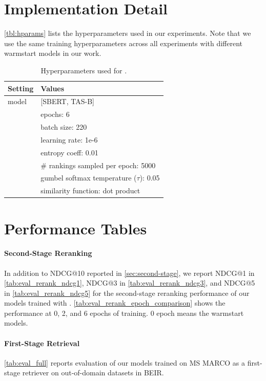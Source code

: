 \documentclass{article}
\begin{document}
\section{Implementation Detail}
\label{app:implementation}
\autoref{tbl:hparams} lists the hyperparameters used in our experiments. Note that we use the same training hyperparameters across all experiments with different warmstart models in our work.
\begin{table}[tb!]
\centering
    \caption{Hyperparameters used for \alg{}.}
   \begin{tabular}{ll}
       \toprule
       \textbf{Setting} & \textbf{Values} \\
       \midrule
       model   & [SBERT, TAS-B]\\
       \midrule
       \alg{} & epochs: 6 \\
              & batch size: 220 \\
              & learning rate: 1e-6 \\
              & entropy coeff: 0.01 \\
              & \# rankings sampled per epoch: 5000 \\
              & gumbel softmax temperature ($\tau$): 0.05 \\
              & similarity function: dot product \\ 
       \bottomrule
   \end{tabular}
   \vspace{0.5mm}
   
   \label{tbl:hparams}
\end{table}

\section{Performance Tables}
\paragraph{Second-Stage Reranking}
In addition to NDCG@10 reported 
in \autoref{sec:second-stage}, we report NDCG@1 in \autoref{tab:eval_rerank_ndcg1}, NDCG@3 in \autoref{tab:eval_rerank_ndcg3}, and NDCG@5 in \autoref{tab:eval_rerank_ndcg5} for the second-stage reranking performance of our models trained with \alg{}. \autoref{tab:eval_rerank_epoch_comparison} shows the performance at 0, 2, and 6 epochs of training. 0 epoch means the warmstart models.


\paragraph{First-Stage Retrieval}
\autoref{tab:eval_full} reports evaluation of our models trained on MS MARCO as a first-stage retriever on out-of-domain datasets in BEIR.
\end{document}

